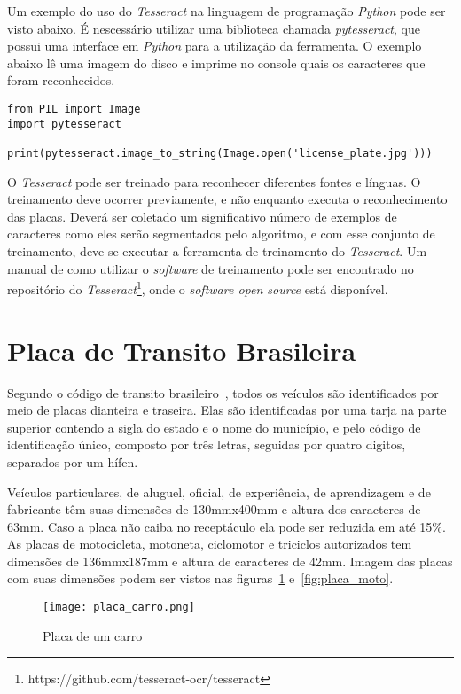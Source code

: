 Um exemplo do uso do \emph{Tesseract} na linguagem de programação \emph{Python} pode ser
visto abaixo. É nescessário utilizar uma biblioteca chamada \emph{pytesseract}, que possui
uma interface em \emph{Python} para a utilização da ferramenta. O exemplo abaixo lê uma
imagem do disco e imprime no console quais os caracteres que foram reconhecidos.

\begin{lstlisting}
from PIL import Image
import pytesseract

print(pytesseract.image_to_string(Image.open('license_plate.jpg')))
\end{lstlisting}

O \emph{Tesseract} pode ser treinado para reconhecer diferentes fontes e línguas. O
treinamento deve ocorrer previamente, e não enquanto executa o reconhecimento das placas.
Deverá ser coletado um significativo número de exemplos de caracteres como eles serão segmentados
pelo algoritmo, e com esse conjunto de treinamento, deve se executar a ferramenta de treinamento do
\emph{Tesseract}. Um manual de como utilizar o \emph{software} de treinamento pode ser encontrado
no repositório do \emph{Tesseract}\footnote{https://github.com/tesseract-ocr/tesseract}, onde o
\emph{software open source} está disponível.


\section{Placa de Transito Brasileira}
\label{sec:placabr}

Segundo o código de transito brasileiro~\cite{brasil1997lei}, todos os veículos
são identificados por meio de placas dianteira e traseira. Elas são
identificadas por uma tarja na parte superior contendo a sigla do estado e o
nome do município, e pelo código de identificação único, composto por três
letras, seguidas por quatro digitos, separados por um hífen.

Veículos particulares, de aluguel, oficial, de experiência, de aprendizagem e de
fabricante têm suas dimensões de 130mmx400mm e altura dos caracteres de 63mm.
Caso a placa não caiba no receptáculo ela pode ser reduzida em até 15\%. As
placas de motocicleta, motoneta, ciclomotor e triciclos autorizados tem
dimensões de 136mmx187mm e altura de caracteres de 42mm. Imagem das placas com
suas dimensões podem ser vistos nas figuras~\ref{fig:placa_carro}
e~\ref{fig:placa_moto}.

\begin{figure}[H]
	\centering
	\texttt{[image: placa\_carro.png]}
	\caption{Placa de um carro}
	\label{fig:placa_carro}
\end{figure}

